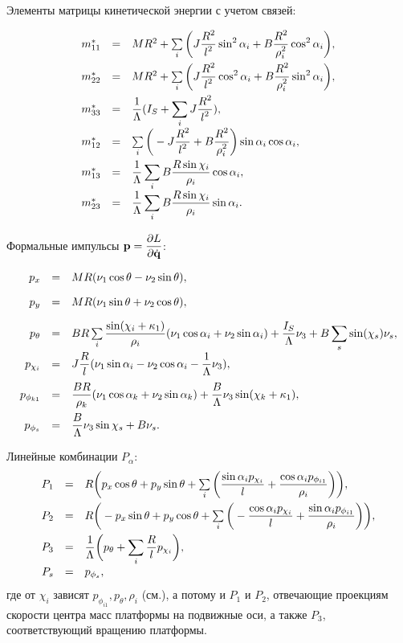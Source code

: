 Элементы матрицы кинетической энергии с учетом связей:

\begin{equation}\label{mstar}
    \begin{array}{rcl}
        m^*_{11} & = & MR^2 + \sum\limits_i \bigg( J\ddfrac{R^2}{l^2}\sin^2\alpha_i + B\ddfrac{R^2}{\rho_i^2}\cos^2\alpha_i\bigg),\vsp
        m^*_{22} & = & MR^2 + \sum\limits_i \bigg(J\ddfrac{R^2}{l^2}\cos^2\alpha_i + B\ddfrac{R^2}{\rho_i^2}\sin^2\alpha_i\bigg),\vsp
        m^*_{33} & = & \ddfrac{1}{\Lambda}(I_S + \sum\limits_i J\ddfrac{R^2}{l^2}),\vsp
        m^*_{12} & = & \sum\limits_i \bigg(-J\ddfrac{R^2}{l^2} + B\ddfrac{R^2}{\rho_i^2}\bigg)\sin\alpha_i\cos\alpha_i,\vsp
        m^*_{13} & = & \ddfrac{1}{\Lambda}\sum\limits_i %
        B\ddfrac{R\sin\chi_i}{\rho_i}\cos\alpha_i%
        ,\vsp
        m^*_{23} & = & \ddfrac{1}{\Lambda}\sum\limits_i %
        B\ddfrac{R\sin\chi_i}{\rho_i}\sin\alpha_i%
        .\vsp
    \end{array}
\end{equation}

Формальные импульсы $\boldsymbol{\mathbf{p}} = \displaystyle\frac{\displaystyle \partial L}{\displaystyle \partial \dot{\boldsymbol{\mathbf{q}}}}$:

\begin{equation}\label{p}
    \begin{array}{rcl}
        p_x & = & MR(\nu_1\cos\theta-\nu_2\sin\theta),\vsp
        p_y & = & MR(\nu_1\sin\theta+\nu_2\cos\theta),\vsp
        p_\theta & = & BR\sum\limits_i\ddfrac{\sin(\chi_i + \kappa_1)}{\rho_i}(\nu_1\cos\alpha_i + \nu_2\sin\alpha_i) + \ddfrac{I_S}{\Lambda}\nu_3 + B\sum\limits_s\sin(\chi_s)\nu_s,\vsp
        p_{\chi_i} & = & J\ddfrac{R}{l}(\nu_1\sin\alpha_i - \nu_2\cos\alpha_i - \ddfrac{1}{\Lambda}\nu_3),\vsp
        p_{\phi_{k1}} & = & \ddfrac{BR}{\rho_k}(\nu_1\cos\alpha_k + \nu_2\sin\alpha_k) + \ddfrac{B}{\Lambda}\nu_3\sin(\chi_k+\kappa_1),\vsp
        p_{\phi_s} & = & \ddfrac{B}{\Lambda}\nu_3\sin\chi_s + B\nu_s.
    \end{array}
\end{equation}

Линейные комбинации $P_\alpha$:
\begin{equation}\label{bigP}
    \begin{array}{rcl}
        P_1 & = & R\bigg(p_x\cos\theta + p_y\sin\theta + \sum\limits_{i}\bigg(\ddfrac{\sin\alpha_ip_{\chi_i}}{l} +  \ddfrac{\cos\alpha_ip_{\phi_{i1}}}{\rho_i}\bigg)\bigg),\vsp
        P_2 & = & R\bigg(-p_x\sin\theta + p_y\cos\theta + \sum\limits_{i}\bigg(-\ddfrac{\cos\alpha_ip_{\chi_i}}{l} +  \ddfrac{\sin\alpha_ip_{\phi_{i1}}}{\rho_i}\bigg)\bigg),\vsp
        P_3 & = & \ddfrac{1}{\Lambda}\bigg(p_\theta + \sum\limits_{i}\ddfrac{R}{l}p_{\chi_i}\bigg),\vsp
        P_s & = & p_{\phi_s},
    \end{array}
\end{equation}
где от $\chi_i$ зависят $p_{\phi_{i1}}, p_\theta, \rho_i$ (см.), а потому и $P_1$ и $P_2$, отвечающие проекциям скорости центра масс платформы на подвижные оси, а также $P_3$, соответствующий вращению платформы.

